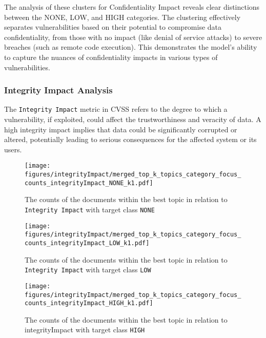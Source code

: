 The analysis of these clusters for Confidentiality Impact reveals clear distinctions between the NONE, LOW, and HIGH categories. The clustering effectively separates vulnerabilities based on their potential to compromise data confidentiality, from those with no impact (like denial of service attacks) to severe breaches (such as remote code execution). This demonstrates the model's ability to capture the nuances of confidentiality impacts in various types of vulnerabilities.

\subsubsection{Integrity Impact Analysis}

The \texttt{Integrity Impact} metric in CVSS refers to the degree to which a vulnerability, if exploited, could affect the trustworthiness and veracity of data. A high integrity impact implies that data could be significantly corrupted or altered, potentially leading to serious consequences for the affected system or its users.

\begin{figure}[t]
	\begin{center}
		\texttt{[image: figures/integrityImpact/merged\_top\_k\_topics\_category\_focus\_counts\_integrityImpact\_NONE\_k1.pdf]}
	\end{center}
	\caption{The counts of the documents within the best topic in relation to \texttt{Integrity Impact} with target class \texttt{NONE}}
	\label{fig:integrityImpact_60_NONE}

\end{figure}

\begin{figure}[t]
	\begin{center}
		\texttt{[image: figures/integrityImpact/merged\_top\_k\_topics\_category\_focus\_counts\_integrityImpact\_LOW\_k1.pdf]}
	\end{center}
	\caption{The counts of the documents within the best topic in relation to \texttt{Integrity Impact} with target class \texttt{LOW}}
	\label{fig:integrityImpact_60_LOW}

\end{figure}

\begin{figure}[t]
	\begin{center}
		\texttt{[image: figures/integrityImpact/merged\_top\_k\_topics\_category\_focus\_counts\_integrityImpact\_HIGH\_k1.pdf]}
	\end{center}
	\caption{The counts of the documents within the best topic in relation to integrityImpact with target class \texttt{HIGH}}
	\label{fig:integrityImpact_60_HIGH}

\end{figure}

